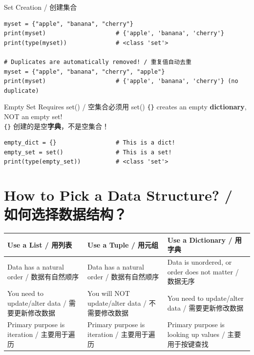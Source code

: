 \documentclass[11pt,a4paper]{report}
\let\oldtexttt\texttt
\renewcommand{\texttt}[1]{\textcolor{mainblue}{\oldtexttt{#1}}}
\begin{document}
\begin{examplebox}{Set Creation / 创建集合}
\begin{lstlisting}
myset = {"apple", "banana", "cherry"}
print(myset)                    # {'apple', 'banana', 'cherry'}
print(type(myset))              # <class 'set'>

# Duplicates are automatically removed! / 重复值自动去重
myset = {"apple", "banana", "cherry", "apple"}
print(myset)                    # {'apple', 'banana', 'cherry'} (no duplicate)
\end{lstlisting}
\end{examplebox}

\begin{warning}{Empty Set Requires set() / 空集合必须用 set()}
    \texttt{\{\}} creates an empty \textbf{dictionary}, NOT an empty set! \\
    \texttt{\{\}} 创建的是空\textbf{字典}，不是空集合！
    \begin{lstlisting}
empty_dict = {}                 # This is a dict!
empty_set = set()               # This is a set!
print(type(empty_set))          # <class 'set'>
    \end{lstlisting}
\end{warning}

\section{How to Pick a Data Structure? / 如何选择数据结构？}

\medskip
\centering
\renewcommand{\arraystretch}{1.8}
\begin{tabular}{@{}p{4cm}p{4cm}p{4cm}@{}}
\toprule
\textbf{Use a List / 用列表} & \textbf{Use a Tuple / 用元组} & \textbf{Use a Dictionary / 用字典} \\ \midrule
Data has a natural order / 数据有自然顺序 & Data has a natural order / 数据有自然顺序 & Data is unordered, or order does not matter / 数据无序 \\
You need to update/alter data / 需要更新修改数据 & You will NOT update/alter data / 不需要修改数据 & You need to update/alter data / 需要更新修改数据 \\
Primary purpose is iteration / 主要用于遍历 & Primary purpose is iteration / 主要用于遍历 & Primary purpose is looking up values / 主要用于按键查找 \\ \bottomrule
\end{tabular}
\medskip
\end{document}
